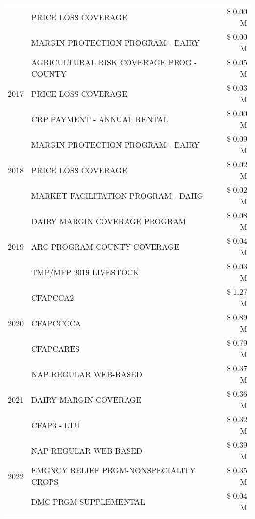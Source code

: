 \begin{tabular}{llr}
 & PRICE LOSS COVERAGE & \$ 0.00 M \\
 & MARGIN PROTECTION PROGRAM - DAIRY & \$ 0.00 M \\
\cline{1-3}
\multirow[t]{3}{*}{2017} & AGRICULTURAL RISK COVERAGE PROG - COUNTY & \$ 0.05 M \\
 & PRICE LOSS COVERAGE & \$ 0.03 M \\
 & CRP PAYMENT - ANNUAL RENTAL & \$ 0.00 M \\
\cline{1-3}
\multirow[t]{3}{*}{2018} & MARGIN PROTECTION PROGRAM - DAIRY & \$ 0.09 M \\
 & PRICE LOSS COVERAGE & \$ 0.02 M \\
 & MARKET FACILITATION PROGRAM - DAHG & \$ 0.02 M \\
\cline{1-3}
\multirow[t]{3}{*}{2019} & DAIRY MARGIN COVERAGE PROGRAM & \$ 0.08 M \\
 & ARC PROGRAM-COUNTY COVERAGE & \$ 0.04 M \\
 & TMP/MFP 2019 LIVESTOCK & \$ 0.03 M \\
\cline{1-3}
\multirow[t]{3}{*}{2020} & CFAPCCA2 & \$ 1.27 M \\
 & CFAPCCCCA & \$ 0.89 M \\
 & CFAPCARES & \$ 0.79 M \\
\cline{1-3}
\multirow[t]{3}{*}{2021} & NAP REGULAR WEB-BASED & \$ 0.37 M \\
 & DAIRY MARGIN COVERAGE & \$ 0.36 M \\
 & CFAP3 - LTU & \$ 0.32 M \\
\cline{1-3}
\multirow[t]{3}{*}{2022} & NAP REGULAR WEB-BASED & \$ 0.39 M \\
 & EMGNCY RELIEF PRGM-NONSPECIALITY CROPS & \$ 0.35 M \\
 & DMC PRGM-SUPPLEMENTAL & \$ 0.04 M \\
\cline{1-3}
\bottomrule
\end{tabular}
